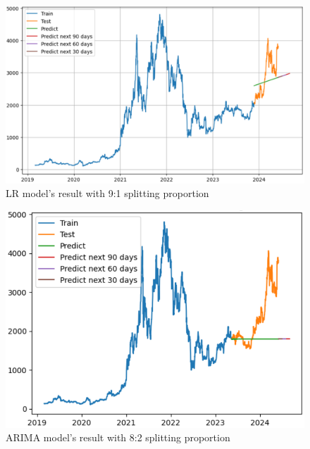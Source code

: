 \documentclass{ieeeojies}
\begin{document}
\begin{figure}[H]
	\centering
	\begin{minipage}{0.8\linewidth}
		\centering
		\includegraphics[width=\linewidth]{bibliography/Images/LR_ETH_91.PNG}
		\caption{LR model's result with 9:1 splitting proportion}
	\end{minipage}
\end{figure}
\begin{figure}[H]
	\centering
	\begin{minipage}{0.8\linewidth}
		\centering
		\includegraphics[width=\linewidth]{bibliography/Images/ARIMA_ETH_82.PNG}
		\caption{ARIMA model's result with 8:2 splitting proportion}
	\end{minipage}
\end{figure}
\end{document}
